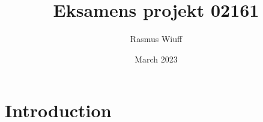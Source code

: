 \documentclass{article}
\title{Eksamens projekt 02161}
\author{Rasmus Wiuff}
\date{March 2023}
\begin{document}
\maketitle

\section{Introduction}
\end{document}
